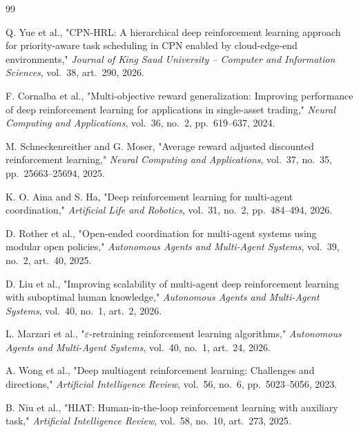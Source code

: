 \documentclass[12pt,a4paper]{report}
\begin{document}
\begin{thebibliography}{99}
\sloppy

Q. Yue et al., "CPN-HRL: A hierarchical deep reinforcement learning approach for priority-aware task scheduling in CPN enabled by cloud-edge-end environments," \textit{Journal of King Saud University -- Computer and Information Sciences}, vol.~38, art.~290, 2026.

F. Cornalba et al., "Multi-objective reward generalization: Improving performance of deep reinforcement learning for applications in single-asset trading," \textit{Neural Computing and Applications}, vol.~36, no.~2, pp.~619--637, 2024.

M. Schneckenreither and G. Moser, "Average reward adjusted discounted reinforcement learning," \textit{Neural Computing and Applications}, vol.~37, no.~35, pp.~25663--25694, 2025.

K. O. Aina and S. Ha, "Deep reinforcement learning for multi-agent coordination," \textit{Artificial Life and Robotics}, vol.~31, no.~2, pp.~484--494, 2026.

D. Rother et al., "Open-ended coordination for multi-agent systems using modular open policies," \textit{Autonomous Agents and Multi-Agent Systems}, vol.~39, no.~2, art.~40, 2025.

D. Liu et al., "Improving scalability of multi-agent deep reinforcement learning with suboptimal human knowledge," \textit{Autonomous Agents and Multi-Agent Systems}, vol.~40, no.~1, art.~2, 2026.

L. Marzari et al., "$\varepsilon$-retraining reinforcement learning algorithms," \textit{Autonomous Agents and Multi-Agent Systems}, vol.~40, no.~1, art.~24, 2026.

A. Wong et al., "Deep multiagent reinforcement learning: Challenges and directions," \textit{Artificial Intelligence Review}, vol.~56, no.~6, pp.~5023--5056, 2023.

B. Niu et al., "HIAT: Human-in-the-loop reinforcement learning with auxiliary task," \textit{Artificial Intelligence Review}, vol.~58, no.~10, art.~273, 2025.


\end{thebibliography}
\end{document}
